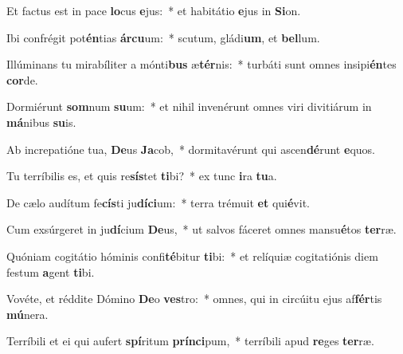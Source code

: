 \item Et factus est in pace \textbf{lo}cus \textbf{e}jus:~* et habitátio \textbf{e}jus in \textbf{Si}on.
\item Ibi confrégit pot\textbf{én}tias \textbf{ár}\textbf{cu}um:~* scutum, gládi\textbf{um}, et \textbf{bel}lum.
\item Illúminans tu mirabíliter a mónti\textbf{bus} æ\textbf{tér}nis:~* turbáti sunt omnes insipi\textbf{én}tes \textbf{cor}de.
\item Dormiérunt \textbf{som}num \textbf{su}um:~* et nihil invenérunt omnes viri divitiárum in \textbf{má}nibus \textbf{su}is.
\item Ab increpatióne tua, \textbf{De}us \textbf{Ja}cob,~* dormitavérunt qui ascen\textbf{dé}runt \textbf{e}quos.
\item Tu terríbilis es, et quis re\textbf{sís}tet \textbf{ti}bi?~* ex tunc \textbf{i}ra \textbf{tu}a.
\item De cælo audítum fe\textbf{cís}ti ju\textbf{dí}\textbf{ci}um:~* terra trémuit \textbf{et} qui\textbf{é}vit.
\item Cum exsúrgeret in ju\textbf{dí}cium \textbf{De}us,~* ut salvos fáceret omnes mansu\textbf{é}tos \textbf{ter}ræ.
\item Quóniam cogitátio hóminis confi\textbf{té}bitur \textbf{ti}bi:~* et relíquiæ cogitatiónis diem festum \textbf{a}gent \textbf{ti}bi.
\item Vovéte, et réddite Dómino \textbf{De}o \textbf{ves}tro:~* omnes, qui in circúitu ejus af\textbf{fér}tis \textbf{mú}nera.
\item Terríbili et ei qui aufert \textbf{spí}ritum \textbf{prín}\textbf{ci}pum,~* terríbili apud \textbf{re}ges \textbf{ter}ræ.
